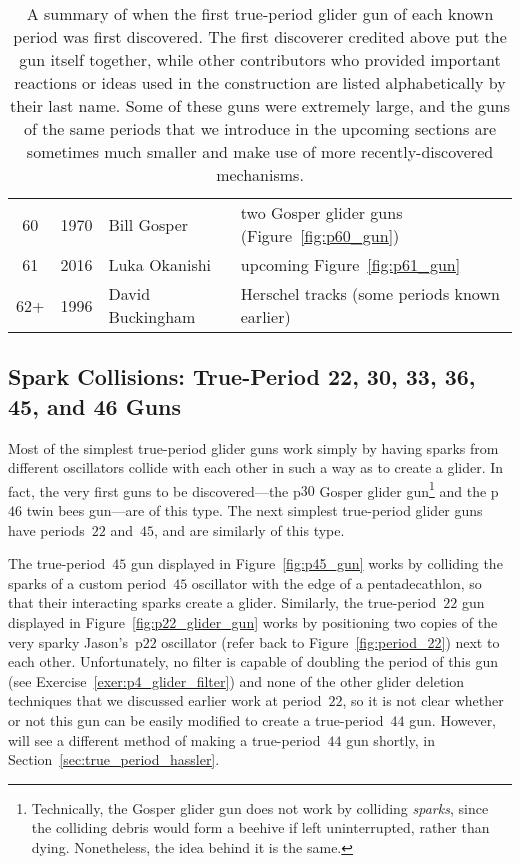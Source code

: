 \begin{table}[!htbp]
\begin{center}
\begin{tabular}{ccll}
			60 & 1970 & Bill Gosper & two Gosper glider guns (Figure~\ref{fig:p60_gun}) \\
			\rowcolor{gray!20} 61 & 2016 & Luka Okanishi & upcoming Figure~\ref{fig:p61_gun} \\
			62+ & 1996 & David Buckingham & Herschel tracks (some periods known earlier) \\\bottomrule
		\end{tabular}
		\caption{A summary of when the first true-period glider gun of each known period was first discovered. The first discoverer credited above put the gun itself together, while other contributors who provided important reactions or ideas used in the construction are listed alphabetically by their last name. Some of these guns were extremely large, and the guns of the same periods that we introduce in the upcoming sections are sometimes much smaller and make use of more recently-discovered mechanisms.}\label{tab:true_period_glider_gun}
	\end{center}
\end{table}


\subsection{Spark Collisions: True-Period 22, 30, 33, 36, 45, and 46 Guns}\label{sec:true_period_spark}

Most of the simplest true-period glider guns work simply by having sparks from different oscillators collide with each other in such a way as to create a glider. In fact, the very first guns to be discovered---the p$30$ Gosper glider gun\footnote{Technically, the Gosper glider gun does not work by colliding \emph{sparks}, since the colliding debris would form a beehive if left uninterrupted, rather than dying. Nonetheless, the idea behind it is the same.} and the p$46$ twin bees gun---are of this type. The next simplest true-period glider guns have periods~$22$ and~$45$, and are similarly of this type.

The true-period~$45$ gun displayed in Figure~\ref{fig:p45_gun} works by colliding the sparks of a custom period~$45$ oscillator with the edge of a pentadecathlon, so that their interacting sparks create a glider. Similarly, the true-period~$22$ gun displayed in Figure~\ref{fig:p22_glider_gun} works by positioning two copies of the very sparky Jason's~p$22$ oscillator (refer back to Figure~\ref{fig:period_22}) next to each other. Unfortunately, no filter is capable of doubling the period of this gun (see Exercise~\ref{exer:p4_glider_filter}) and none of the other glider deletion techniques that we discussed earlier work at period~$22$, so it is not clear whether or not this gun can be easily modified to create a true-period~$44$ gun. However, will see a different method of making a true-period~$44$ gun shortly, in Section~\ref{sec:true_period_hassler}.

